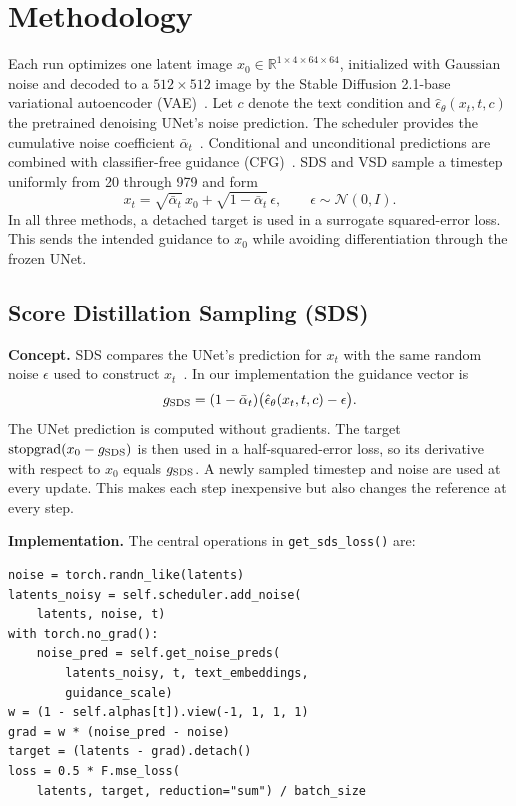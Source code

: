 \section{Methodology}
\label{sec:method}

Each run optimizes one latent image $x_0\in\mathbb{R}^{1\times4\times64\times64}$, initialized with Gaussian noise and decoded to a $512\times512$ image by the Stable Diffusion 2.1-base variational autoencoder (VAE)~\cite{rombach2022ldm}. Let $c$ denote the text condition and $\hat\epsilon_\theta(x_t,t,c)$ the pretrained denoising UNet's noise prediction. The scheduler provides the cumulative noise coefficient $\bar\alpha_t$~\cite{ho2020ddpm,song2021ddim}. Conditional and unconditional predictions are combined with classifier-free guidance (CFG)~\cite{ho2022cfg}. SDS and VSD sample a timestep uniformly from 20 through 979 and form
\begin{equation}
x_t=\sqrt{\bar\alpha_t}\,x_0+\sqrt{1-\bar\alpha_t}\,\epsilon,
\qquad \epsilon\sim\mathcal N(0,I).
\end{equation}
In all three methods, a detached target is used in a surrogate squared-error loss. This sends the intended guidance to $x_0$ while avoiding differentiation through the frozen UNet.

\subsection{Score Distillation Sampling (SDS)}
\label{sec:sds}

\noindent\textbf{Concept.} SDS compares the UNet's prediction for $x_t$ with the same random noise $\epsilon$ used to construct $x_t$~\cite{poole2023dreamfusion}. In our implementation the guidance vector is
\begin{equation}
g_{\rm SDS}=(1-\bar\alpha_t)
  \bigl(\hat\epsilon_\theta(x_t,t,c)-\epsilon\bigr).
\end{equation}
The UNet prediction is computed without gradients. The target $\operatorname{stopgrad}(x_0-g_{\rm SDS})$ is then used in a half-squared-error loss, so its derivative with respect to $x_0$ equals $g_{\rm SDS}$. A newly sampled timestep and noise are used at every update. This makes each step inexpensive but also changes the reference at every step.

\noindent\textbf{Implementation.} The central operations in \texttt{get\_sds\_loss()} are:
\begin{lstlisting}
noise = torch.randn_like(latents)
latents_noisy = self.scheduler.add_noise(
    latents, noise, t)
with torch.no_grad():
    noise_pred = self.get_noise_preds(
        latents_noisy, t, text_embeddings,
        guidance_scale)
w = (1 - self.alphas[t]).view(-1, 1, 1, 1)
grad = w * (noise_pred - noise)
target = (latents - grad).detach()
loss = 0.5 * F.mse_loss(
    latents, target, reduction="sum") / batch_size
\end{lstlisting}

